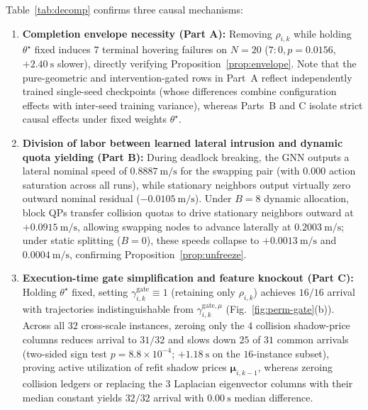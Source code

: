 Table~\ref{tab:decomp} confirms three causal mechanisms:
\begin{enumerate}
 \item \textbf{Completion envelope necessity (Part A):} Removing $\rho_{i,k}$ while holding $\theta^\star$ fixed induces $7$ terminal hovering failures on $N=20$ ($7:0,p=0.0156$, $+2.40\ \mathrm s$ slower), directly verifying Proposition~\ref{prop:envelope}. Note that the pure-geometric and intervention-gated rows in Part~A reflect independently trained single-seed checkpoints (whose differences combine configuration effects with inter-seed training variance), whereas Parts~B and C isolate strict causal effects under fixed weights $\theta^\star$.
 \item \textbf{Division of labor between learned lateral intrusion and dynamic quota yielding (Part B):} During deadlock breaking, the GNN outputs a lateral nominal speed of $0.8887\ \mathrm{m/s}$ for the swapping pair (with $0.000$ action saturation across all runs), while stationary neighbors output virtually zero outward nominal residual ($-0.0105\ \mathrm{m/s}$). Under $B=8$ dynamic allocation, block QPs transfer collision quotas to drive stationary neighbors outward at $+0.0915\ \mathrm{m/s}$, allowing swapping nodes to advance laterally at $0.2003\ \mathrm{m/s}$; under static splitting ($B=0$), these speeds collapse to $+0.0013\ \mathrm{m/s}$ and $0.0004\ \mathrm{m/s}$, confirming Proposition~\ref{prop:unfreeze}.
 \item \textbf{Execution-time gate simplification and feature knockout (Part C):} Holding $\theta^\star$ fixed, setting $\gamma_{i,k}^{\mathrm{gate}}\equiv 1$ (retaining only $\rho_{i,k}$) achieves $16/16$ arrival with trajectories indistinguishable from $\gamma_{i,k}^{\mathrm{gate},\mu}$ (Fig.~\ref{fig:perm-gate}(b)). Across all $32$ cross-scale instances, zeroing only the $4$ collision shadow-price columns reduces arrival to $31/32$ and slows down $25$ of $31$ common arrivals (two-sided sign test $p=8.8\times 10^{-4}$; $+1.18\ \mathrm s$ on the $16$-instance subset), proving active utilization of refit shadow prices $\boldsymbol\mu_{i,k-1}$, whereas zeroing collision ledgers or replacing the $3$ Laplacian eigenvector columns with their median constant yields $32/32$ arrival with $0.00\ \mathrm s$ median difference.
\end{enumerate}

